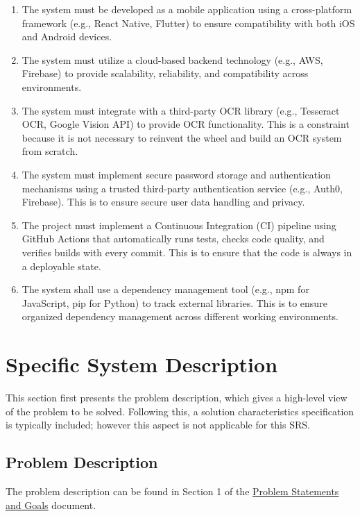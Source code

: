 \documentclass[12pt]{article}
\begin{document}
\begin{enumerate}[label=C\arabic*]
  \item The system must be developed as a mobile application using a
  cross-platform framework (e.g., React Native, Flutter) to ensure
  compatibility with both iOS and Android devices.
  \item The system must utilize a cloud-based backend technology (e.g., AWS,
  Firebase) to provide scalability, reliability, and compatibility across
  environments.
  \item The system must integrate with a third-party OCR library (e.g.,
  Tesseract OCR, Google Vision API) to provide OCR functionality. This is a
  constraint because it is not necessary to reinvent the wheel and build an OCR
  system from scratch.
  \item The system must implement secure password storage and authentication
  mechanisms using a trusted third-party authentication service (e.g., Auth0,
  Firebase). This is to ensure secure user data handling and privacy.
  \item The project must implement a Continuous Integration (CI) pipeline using
  GitHub Actions that automatically runs tests, checks code quality, and
  verifies builds with every commit. This is to ensure that the code is always
  in a deployable state.
  \item The system shall use a dependency management tool (e.g., npm for
  JavaScript, pip for Python) to track external libraries. This is to ensure
  organized dependency management across different working environments. 
\end{enumerate}

\newpage

\section{Specific System Description}

This section first presents the problem description, which gives a high-level
view of the problem to be solved. Following this, a solution characteristics
specification is typically included; however this aspect is not applicable for
this SRS.


\subsection{Problem Description}\label{Sec_pd}

The problem description can be found in Section 1 of the
\href{https://github.com/PlutosCapstone/Plutos/blob/main/docs/ProblemStatementAndGoals/ProblemStatement.pdf}{Problem
Statements and Goals} document.
\end{document}
